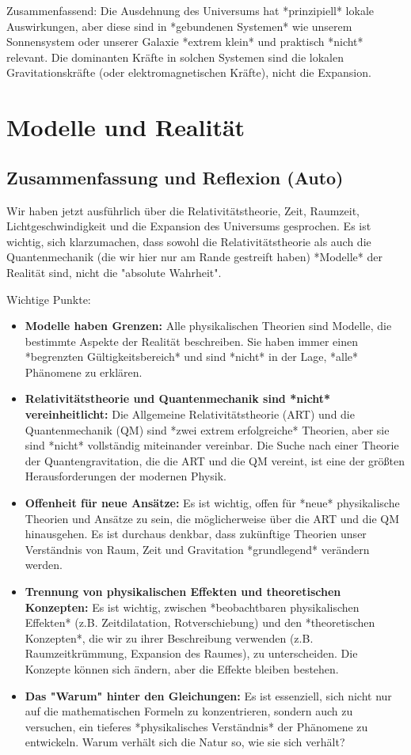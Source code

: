\documentclass{article}
\begin{document}
	Zusammenfassend: Die Ausdehnung des Universums hat *prinzipiell* lokale Auswirkungen, aber diese sind in *gebundenen Systemen* wie unserem Sonnensystem oder unserer Galaxie *extrem klein* und praktisch *nicht* relevant. Die dominanten Kräfte in solchen Systemen sind die lokalen Gravitationskräfte (oder elektromagnetischen Kräfte), nicht die Expansion.
	
	\section{Modelle und Realität}
	
	\subsection{Zusammenfassung und Reflexion (Auto)}
	
	Wir haben jetzt ausführlich über die Relativitätstheorie, Zeit, Raumzeit, Lichtgeschwindigkeit und die Expansion des Universums gesprochen. Es ist wichtig, sich klarzumachen, dass sowohl die Relativitätstheorie als auch die Quantenmechanik (die wir hier nur am Rande gestreift haben) *Modelle* der Realität sind, nicht die "absolute Wahrheit".
	
	Wichtige Punkte:
	
	\begin{itemize}
		\item \textbf{Modelle haben Grenzen:} Alle physikalischen Theorien sind Modelle, die bestimmte Aspekte der Realität beschreiben. Sie haben immer einen *begrenzten Gültigkeitsbereich* und sind *nicht* in der Lage, *alle* Phänomene zu erklären.
		\item \textbf{Relativitätstheorie und Quantenmechanik sind *nicht* vereinheitlicht:} Die Allgemeine Relativitätstheorie (ART) und die Quantenmechanik (QM) sind *zwei extrem erfolgreiche* Theorien, aber sie sind *nicht* vollständig miteinander vereinbar.  Die Suche nach einer Theorie der Quantengravitation, die die ART und die QM vereint, ist eine der größten Herausforderungen der modernen Physik.
		\item \textbf{Offenheit für neue Ansätze:} Es ist wichtig, offen für *neue* physikalische Theorien und Ansätze zu sein, die möglicherweise über die ART und die QM hinausgehen.  Es ist durchaus denkbar, dass zukünftige Theorien unser Verständnis von Raum, Zeit und Gravitation *grundlegend* verändern werden.
		\item \textbf{Trennung von physikalischen Effekten und theoretischen Konzepten:} Es ist wichtig, zwischen *beobachtbaren physikalischen Effekten* (z.B. Zeitdilatation, Rotverschiebung) und den *theoretischen Konzepten*, die wir zu ihrer Beschreibung verwenden (z.B. Raumzeitkrümmung, Expansion des Raumes), zu unterscheiden. Die Konzepte können sich ändern, aber die Effekte bleiben bestehen.
		\item\textbf{Das "Warum" hinter den Gleichungen:} Es ist essenziell, sich nicht nur auf die mathematischen Formeln zu konzentrieren, sondern auch zu versuchen, ein tieferes *physikalisches Verständnis* der Phänomene zu entwickeln. Warum verhält sich die Natur so, wie sie sich verhält?
	\end{itemize}
	
\end{document}
